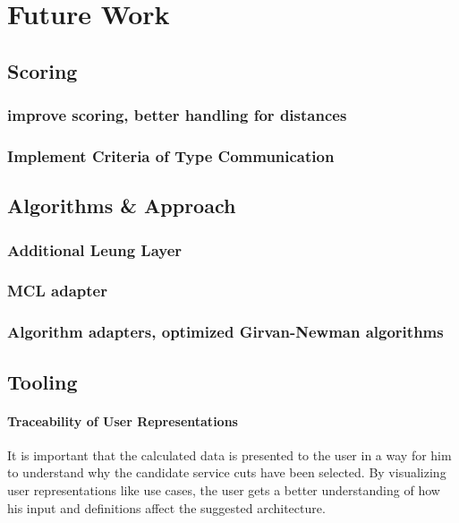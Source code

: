 \chapter{Future Work}
\label{cha:futureWork}

\section{Scoring}

\subsection{improve scoring, better handling for distances }

\subsection{Implement Criteria of Type Communication}


\section{Algorithms \& Approach}

\subsection{Additional Leung Layer}


\subsection{MCL adapter}
\label{subsec:mclAdapter}

\subsection{Algorithm adapters, optimized Girvan-Newman algorithms}


\section{Tooling}


\subsubsection{Traceability of User Representations}

It is important that the calculated data is presented to the user in a way for him to understand why the candidate service cuts have been selected. By visualizing user representations like use cases, the user gets a better understanding of how his input and definitions affect the suggested architecture. 

